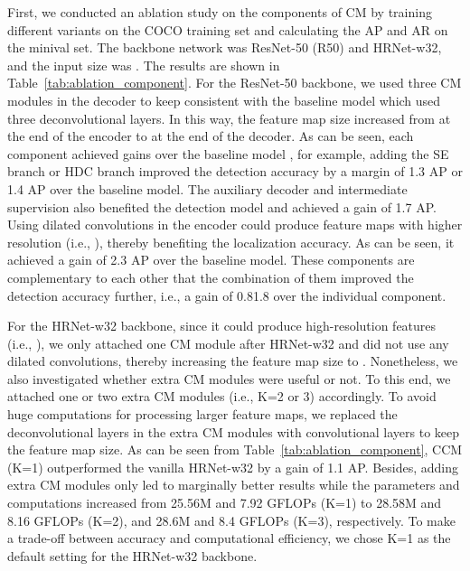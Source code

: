 \documentclass[twocolumn]{svjour3}          \smartqed  \usepackage{natbib}
\begin{document}
First, we conducted an ablation study on the components of CM by training different variants on the COCO training set and calculating the AP and AR on the minival set. The backbone network was ResNet-50 (R50) and HRNet-w32, and the input size was . The results are shown in Table~\ref{tab:ablation_component}. For the ResNet-50 backbone, we used three CM modules in the decoder to keep consistent with the baseline model which used three deconvolutional layers. In this way, the feature map size increased from  at the end of the encoder to  at the end of the decoder. As can be seen, each component achieved gains over the baseline model \citep{xiao2018simple}, for example, adding the SE branch or HDC branch improved the detection accuracy by a margin of 1.3 AP or 1.4 AP over the baseline model. The auxiliary decoder and intermediate supervision also benefited the detection model and achieved a gain of 1.7 AP. Using dilated convolutions in the encoder could produce feature maps with  higher resolution (i.e., ), thereby benefiting the localization accuracy. As can be seen, it achieved a gain of 2.3 AP over the baseline model. These components are complementary to each other that the combination of them improved the detection accuracy further, i.e., a gain of 0.81.8 over the individual component.

For the HRNet-w32 backbone, since it could produce high-resolution features (i.e., ), we only attached one CM module after HRNet-w32 and did not use any dilated convolutions, thereby increasing the feature map size to . Nonetheless, we also investigated whether extra CM modules were useful or not. To this end, we attached one or two extra CM modules (i.e., K=2 or 3) accordingly. To avoid huge computations for processing larger feature maps, we replaced the deconvolutional layers in the extra CM modules with convolutional layers to keep the feature map size. As can be seen from Table~\ref{tab:ablation_component}, CCM (K=1) outperformed the vanilla HRNet-w32 by a gain of 1.1 AP. Besides, adding extra CM modules only led to marginally better results while the parameters and computations increased from 25.56M and 7.92 GFLOPs (K=1) to 28.58M and 8.16 GFLOPs (K=2), and 28.6M and 8.4 GFLOPs (K=3), respectively. To make a trade-off between accuracy and computational efficiency, we chose K=1 as the default setting for the HRNet-w32 backbone.
\end{document}

